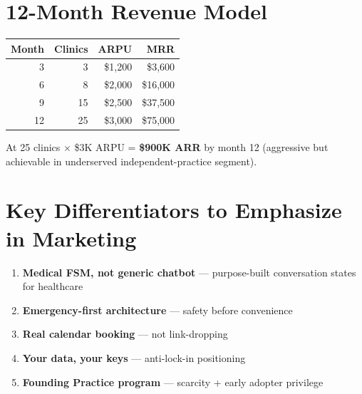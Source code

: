 \documentclass[11pt,a4paper]{article}
\begin{document}
\section{12-Month Revenue Model}

\begin{center}
\small
\begin{tabular}{@{}rrrr@{}}
\toprule
\textbf{Month} & \textbf{Clinics} & \textbf{ARPU} & \textbf{MRR} \\
\midrule
3 & 3 & \$1,200 & \$3,600 \\
6 & 8 & \$2,000 & \$16,000 \\
9 & 15 & \$2,500 & \$37,500 \\
12 & 25 & \$3,000 & \$75,000 \\
\bottomrule
\end{tabular}
\end{center}

At 25 clinics $\times$ \$3K ARPU = \textbf{\$900K ARR} by month 12 (aggressive but achievable in underserved independent-practice segment).

\section{Key Differentiators to Emphasize in Marketing}

\begin{enumerate}[nosep]
  \item \textbf{Medical FSM, not generic chatbot} --- purpose-built conversation states for healthcare
  \item \textbf{Emergency-first architecture} --- safety before convenience
  \item \textbf{Real calendar booking} --- not link-dropping
  \item \textbf{Your data, your keys} --- anti-lock-in positioning
  \item \textbf{Founding Practice program} --- scarcity + early adopter privilege
\end{enumerate}
\end{document}
